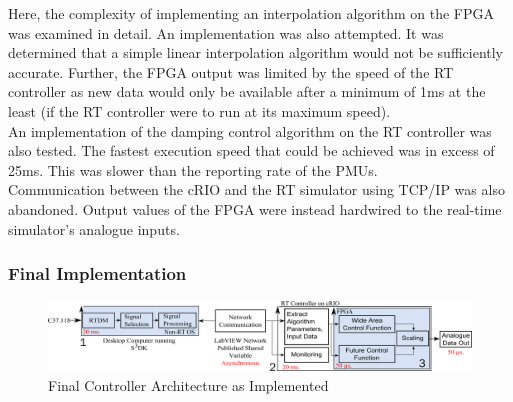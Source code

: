 \documentclass[conference]{IEEEtran}
\begin{document}
Here, the complexity of implementing an interpolation algorithm on the FPGA was examined in detail. An implementation was also attempted. It was determined that a simple linear interpolation algorithm would not be sufficiently accurate. Further, the FPGA output was limited by the speed of the RT controller as new data would only be available after a minimum of 1ms at the least (if the RT controller were to run at its maximum speed). \\

An implementation of the damping control algorithm on the RT controller was also tested. The fastest execution speed that could be achieved was in excess of 25ms. This was slower than the reporting rate of the PMUs.\\

Communication between the cRIO and the RT simulator using TCP/IP was also abandoned. Output values of the FPGA were instead hardwired to the real-time simulator's analogue inputs.\\

\subsubsection{Final Implementation}


\begin{figure}[!b]
\centering
\includegraphics[width=5in]{Final_RT_Arch.png} 
\caption{Final Controller Architecture as Implemented}
\label{Final_arch}
\end{figure}
\end{document}
